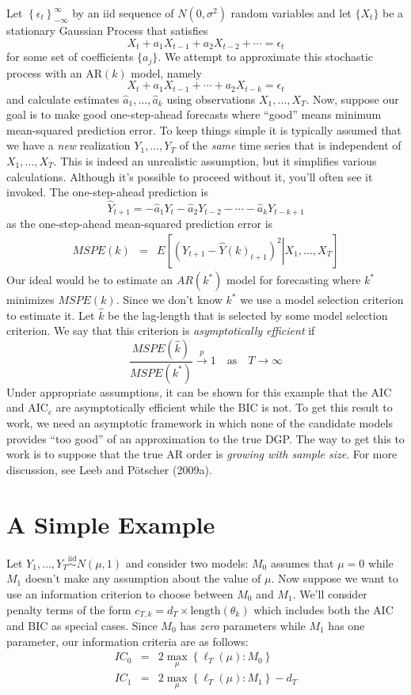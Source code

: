 Let $\left\{\epsilon_t\right\}_{-\infty}^{\infty}$ by an iid sequence of $N(0,\sigma^2)$ random variables and let $\{X_t\}$ be a stationary Gaussian Process that satisfies
$$X_t + a_1 X_{t-1} + a_2 X_{t-2} + \cdots  = \epsilon_t$$  
for some set of coefficients $\{a_j\}$. We attempt to approximate this stochastic process with an AR$(k)$ model, namely
$$X_t + a_1 X_{t-1} + \cdots + a_2 X_{t-k}  = \epsilon_t$$  
and calculate estimates $\widehat{a}_1, \hdots, \widehat{a}_k$ using observations $X_1, \hdots, X_T$. Now, suppose our goal is to make good one-step-ahead forecasts where ``good'' means minimum mean-squared prediction error. To keep things simple it is typically assumed that we have a \emph{new} realization $Y_1, \hdots, Y_T$ of the \emph{same} time series that is independent of $X_1, \hdots, X_T$. This is indeed an unrealistic assumption, but it simplifies various calculations. Although it's possible to proceed without it, you'll often see it invoked. The one-step-ahead prediction is
	$$\widehat{Y}_{t+1} = -\widehat{a}_1 Y_t - \widehat{a}_2 Y_{t-2} - \cdots - \widehat{a}_k Y_{t-k+1}$$
as the one-step-ahead mean-squared prediction error is
	\begin{eqnarray*}
		MSPE(k) &=& E\left[ \left(Y_{t+1} - \widehat{Y}(k)_{t+1}\right)^2\left. \right| X_1, \hdots, X_T\right]
	\end{eqnarray*}
Our ideal would be to estimate an $AR(k^*)$ model for forecasting where $k^*$ minimizes $MSPE(k)$. Since we don't know $k^*$ we use a model selection criterion to estimate it. Let $\widehat{k}$ be the lag-length that is selected by some model selection criterion. We say that this criterion is \emph{asymptotically efficient} if
	$$\frac{MSPE(\widehat{k})}{MSPE(k^*)}\overset{p}{\rightarrow} 1 \quad \mbox{as} \quad T \rightarrow \infty$$
Under appropriate assumptions, it can be shown for this example that the AIC and AIC$_c$ are asymptotically efficient while the BIC is not.
To get this result to work, we need an asymptotic framework in which none of the candidate models provides ``too good'' of an approximation to the true DGP.
The way to get this to work is to suppose that the true AR order is \emph{growing with sample size}.
For more discussion, see Leeb and P\"{o}tscher (2009a).



\section{A Simple Example}
Let $Y_1, \hdots, Y_T \overset{\mbox{iid}}{\sim} N(\mu,1)$ and consider two models: $M_0$ assumes that $\mu = 0$ while $M_1$ doesn't make any assumption about the value of $\mu$. Now suppose we want to use an information criterion to choose between $M_0$ and $M_1$. We'll consider penalty terms of the form $c_{T,k} = d_T 
\times \mbox{length}(\theta_k)$ which includes both the AIC and BIC as special cases. Since $M_0$ has \emph{zero} parameters while $M_1$ has one parameter, our information criteria are as follows:
	\begin{eqnarray*}
		IC_0 &=& 2 \max_\mu \left\{\ell_T(\mu)\colon M_0 \right\} \\
		IC_1 &=& 2 \max_\mu \left\{\ell_T(\mu)\colon M_1 \right\} - d_T
	\end{eqnarray*}

